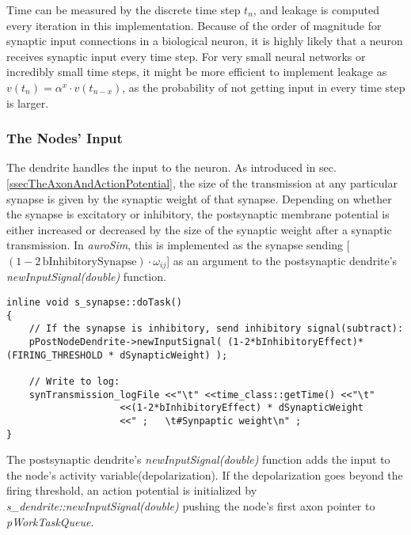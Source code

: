 		Time can be measured by the discrete time step $t_n$, and leakage is computed every iteration in this implementation. %
		Because of the order of magnitude for synaptic input connections in a biological neuron, it is highly likely that a neuron receives synaptic input every time step.
		For very small neural networks or incredibly small time steps, it might be more efficient to implement leakage as $v(t_n) = \alpha^x \cdot v(t_{n-x})$,
			as the probability of not getting input in every time step is larger.

		\subsubsection{The Nodes' Input}
		The dendrite handles the input to the neuron.
		As introduced in sec. \ref{ssecTheAxonAndActionPotential}, the size of the transmission at any particular synapse is given by the synaptic weight of that synapse.
		Depending on whether the synapse is excitatory or inhibitory, the postsynaptic membrane potential is either increased or decreased 
			by the size of the synaptic weight after a synaptic transmission.
		In \emph{auroSim}, this is implemented as the synapse sending [$(1-2\, \text{bInhibitorySynapse})\cdot \omega_{ij}$] as an argument to the postsynaptic dendrite's \emph{newInputSignal(double)} function.
\begin{lstlisting}
inline void s_synapse::doTask()
{
	// If the synapse is inhibitory, send inhibitory signal(subtract):
 	pPostNodeDendrite->newInputSignal( (1-2*bInhibitoryEffect)*(FIRING_THRESHOLD * dSynapticWeight) );

	// Write to log:
	synTransmission_logFile <<"\t" <<time_class::getTime() <<"\t"
					<<(1-2*bInhibitoryEffect) * dSynapticWeight
					<<" ;   \t#Synpaptic weight\n" ;
}
\end{lstlisting}
		The postsynaptic dendrite's \emph{newInputSignal(double)} function adds the input to the node's activity variable(depolarization).
		If the depolarization goes beyond the firing threshold, an action potential is initialized by \emph{s\_dendrite::newInputSignal(double)} 
			pushing the node's first axon pointer to \emph{pWorkTaskQueue}.

